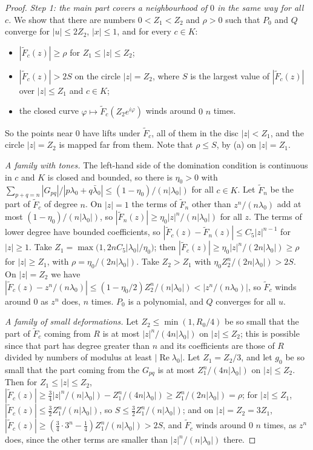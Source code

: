 \documentclass[11pt,reqno]{amsart}
\theoremstyle{plain}
\theoremstyle{definition}
\theoremstyle{remark}
\begin{document}
\begin{proof}
\emph{Step 1: the main part covers a neighbourhood of $0$ in the same way for all $c$.} We show that there are numbers $0<Z_1<Z_2$ and $\rho>0$ such that $P_0$ and $Q$ converge for $|u|\le2Z_2$, $|x|\le1$, and for every $c\in K$:
\begin{itemize}
\item[(a)] $|\tilde F_c(z)|\ge\rho$ for $Z_1\le|z|\le Z_2$;
\item[(b)] $|\tilde F_c(z)|>2S$ on the circle $|z|=Z_2$, where $S$ is the largest value of $|\tilde F_c(z)|$ over $|z|\le Z_1$ and $c\in K$;
\item[(c)] the closed curve $\varphi\mapsto\tilde F_c(Z_2e^{i\varphi})$ winds around $0$ $n$ times.
\end{itemize}
So the points near $0$ have lifts under $\tilde F_c$, all of them in the disc $|z|<Z_1$, and the circle $|z|=Z_2$ is mapped far from them. Note that $\rho\le S$, by (a) on $|z|=Z_1$.

\emph{A family with tones.} The left-hand side of the domination condition is continuous in $c$ and $K$ is closed and bounded, so there is $\eta_0>0$ with $\sum_{p+q=n}|G_{pq}|/|p\lambda_0+q\bar\lambda_0|\le(1-\eta_0)/(n|\lambda_0|)$ for all $c\in K$. Let $\tilde F_n$ be the part of $\tilde F_c$ of degree $n$. On $|z|=1$ the terms of $\tilde F_n$ other than $z^{n}/(n\lambda_0)$ add at most $(1-\eta_0)/(n|\lambda_0|)$, so $|\tilde F_n(z)|\ge\eta_0|z|^{n}/(n|\lambda_0|)$ for all $z$. The terms of lower degree have bounded coefficients, so $|\tilde F_c(z)-\tilde F_n(z)|\le C_5|z|^{n-1}$ for $|z|\ge1$. Take $Z_1=\max\bigl(1,2nC_5|\lambda_0|/\eta_0\bigr)$; then $|\tilde F_c(z)|\ge\eta_0|z|^{n}/(2n|\lambda_0|)\ge\rho$ for $|z|\ge Z_1$, with $\rho=\eta_0/(2n|\lambda_0|)$. Take $Z_2>Z_1$ with $\eta_0Z_2^{n}/(2n|\lambda_0|)>2S$. On $|z|=Z_2$ we have $|\tilde F_c(z)-z^{n}/(n\lambda_0)|\le(1-\eta_0/2)Z_2^{n}/(n|\lambda_0|)<|z^{n}/(n\lambda_0)|$, so $\tilde F_c$ winds around $0$ as $z^{n}$ does, $n$ times. $P_0$ is a polynomial, and $Q$ converges for all $u$.

\emph{A family of small deformations.} Let $Z_2\le\min(1,R_0/4)$ be so small that the part of $\tilde F_c$ coming from $R$ is at most $|z|^{n}/(4n|\lambda_0|)$ on $|z|\le Z_2$; this is possible since that part has degree greater than $n$ and its coefficients are those of $R$ divided by numbers of modulus at least $|\operatorname{Re}\lambda_0|$. Let $Z_1=Z_2/3$, and let $g_0$ be so small that the part coming from the $G_{pq}$ is at most $Z_1^{n}/(4n|\lambda_0|)$ on $|z|\le Z_2$. Then for $Z_1\le|z|\le Z_2$, $|\tilde F_c(z)|\ge\frac34|z|^{n}/(n|\lambda_0|)-Z_1^{n}/(4n|\lambda_0|)\ge Z_1^{n}/(2n|\lambda_0|)=\rho$; for $|z|\le Z_1$, $|\tilde F_c(z)|\le\frac32Z_1^{n}/(n|\lambda_0|)$, so $S\le\frac32Z_1^{n}/(n|\lambda_0|)$; and on $|z|=Z_2=3Z_1$, $|\tilde F_c(z)|\ge(\frac34\cdot3^{n}-\frac14)Z_1^{n}/(n|\lambda_0|)>2S$, and $\tilde F_c$ winds around $0$ $n$ times, as $z^{n}$ does, since the other terms are smaller than $|z|^{n}/(n|\lambda_0|)$ there.


\end{proof}
\end{document}
